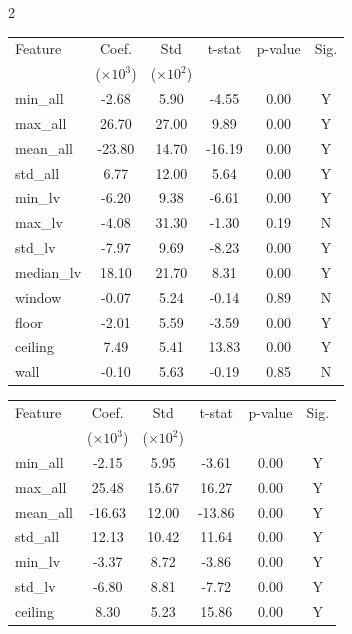 \documentclass[11pt,a4paper]{article}
\begin{document}
\begin{multicols}{2}
\begin{center}
\begin{tabular}{l|c|c|c|c|c}
\hline
Feature & Coef. & Std & t-stat & p-value & Sig. \\
 & ($\times 10^3$) & ($\times 10^2$) & & & \\
\hline
min\_all & -2.68 & 5.90 & -4.55 & 0.00 & Y \\
max\_all & 26.70 & 27.00 & 9.89 & 0.00 & Y \\
mean\_all & -23.80 & 14.70 & -16.19 & 0.00 & Y \\
std\_all & 6.77 & 12.00 & 5.64 & 0.00 & Y \\
min\_lv & -6.20 & 9.38 & -6.61 & 0.00 & Y \\
max\_lv & -4.08 & 31.30 & -1.30 & 0.19 & N \\
std\_lv & -7.97 & 9.69 & -8.23 & 0.00 & Y \\
median\_lv & 18.10 & 21.70 & 8.31 & 0.00 & Y \\
window & -0.07 & 5.24 & -0.14 & 0.89 & N \\
floor & -2.01 & 5.59 & -3.59 & 0.00 & Y \\
ceiling & 7.49 & 5.41 & 13.83 & 0.00 & Y \\
wall & -0.10 & 5.63 & -0.19 & 0.85 & N \\
\hline
\end{tabular}
\label{tab:regression_coefficients}
\end{center}

\begin{center}
\begin{tabular}{l|c|c|c|c|c}
\hline
Feature & Coef. & Std & t-stat & p-value & Sig. \\
 & ($\times 10^3$) & ($\times 10^2$) & & & \\
\hline
min\_all & -2.15 & 5.95 & -3.61 & 0.00 & Y \\
max\_all & 25.48 & 15.67 & 16.27 & 0.00 & Y \\
mean\_all & -16.63 & 12.00 & -13.86 & 0.00 & Y \\
std\_all & 12.13 & 10.42 & 11.64 & 0.00 & Y \\
min\_lv & -3.37 & 8.72 & -3.86 & 0.00 & Y \\
std\_lv & -6.80 & 8.81 & -7.72 & 0.00 & Y \\
ceiling & 8.30 & 5.23 & 15.86 & 0.00 & Y \\
\hline
\end{tabular}
\label{tab:regression_coefficients_plus_fee}
\end{center}


\end{multicols}
\end{document}
